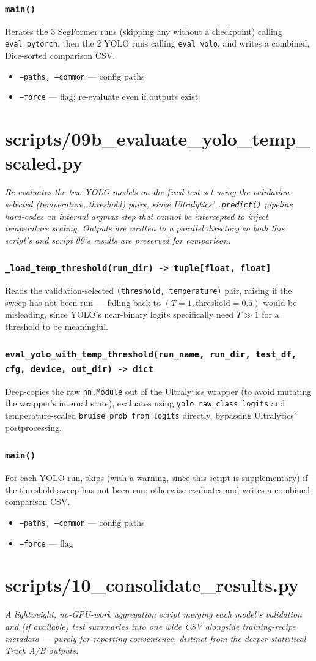 \documentclass[11pt]{article}
\newcommand{\role}[1]{\par\noindent\textit{#1}\par\vspace{0.5em}}
\newcommand{\func}[1]{\subsubsection*{\texttt{#1}}}
\newcommand{\cliarg}[2]{\item \texttt{#1} --- #2}
\begin{document}
\func{main()}
Iterates the 3 SegFormer runs (skipping any without a checkpoint) calling
\texttt{eval\_pytorch}, then the 2 YOLO runs calling \texttt{eval\_yolo}, and
writes a combined, Dice-sorted comparison CSV.

\begin{itemize}[nosep]
\cliarg{--paths, --common}{config paths}
\cliarg{--force}{flag; re-evaluate even if outputs exist}
\end{itemize}

\section{scripts/09b\_evaluate\_yolo\_temp\_scaled.py}
\role{Re-evaluates the two YOLO models on the fixed test set using the
validation-selected (temperature, threshold) pairs, since Ultralytics'
\texttt{.predict()} pipeline hard-codes an internal argmax step that cannot be
intercepted to inject temperature scaling. Outputs are written to a parallel
directory so both this script's and script 09's results are preserved for
comparison.}

\func{\_load\_temp\_threshold(run\_dir) -> tuple[float, float]}
Reads the validation-selected \texttt{(threshold, temperature)} pair, raising if
the sweep has not been run --- falling back to $(T{=}1, \text{threshold}{=}0.5)$
would be misleading, since YOLO's near-binary logits specifically need
$T \gg 1$ for a threshold to be meaningful.

\func{eval\_yolo\_with\_temp\_threshold(run\_name, run\_dir, test\_df, cfg, device, out\_dir) -> dict}
Deep-copies the raw \texttt{nn.Module} out of the Ultralytics wrapper (to avoid
mutating the wrapper's internal state), evaluates using
\texttt{yolo\_raw\_class\_logits} and temperature-scaled \texttt{bruise\_prob\_from\_logits}
directly, bypassing Ultralytics' postprocessing.

\func{main()}
For each YOLO run, skips (with a warning, since this script is supplementary)
if the threshold sweep has not been run; otherwise evaluates and writes a
combined comparison CSV.

\begin{itemize}[nosep]
\cliarg{--paths, --common}{config paths}
\cliarg{--force}{flag}
\end{itemize}

\section{scripts/10\_consolidate\_results.py}
\role{A lightweight, no-GPU-work aggregation script merging each model's
validation and (if available) test summaries into one wide CSV alongside
training-recipe metadata --- purely for reporting convenience, distinct from
the deeper statistical Track A/B outputs.}
\end{document}
